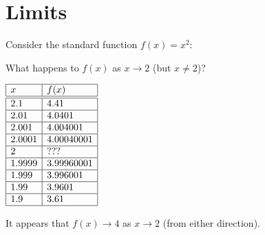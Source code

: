 \documentclass[letterpaper,12pt,fleqn]{article}
\begin{document}
\section*{Limits}

\begin{example}

  Consider the standard function \(f(x)=x^2\):

  \bigskip

  \begin{center}
  \end{center}

  \bigskip

  What happens to \(f(x)\) as \(x\to2\) (but \(x\ne 2\))?

  \bigskip

  \begin{center}
    \(\begin{array}{|l|l|}
    \hline
    x & f(x) \\
    \hline
    \hline
    2.1 & 4.41 \\
    \hline
    2.01 & 4.0401 \\
    \hline
    2.001 & 4.004001 \\
    \hline
    2.0001 & 4.00040001 \\
    \hline
    2 & ??? \\
    \hline
    1.9999 & 3.99960001 \\
    \hline
    1.999 & 3.996001 \\
    \hline
    1.99 & 3.9601 \\
    \hline
    1.9 & 3.61 \\
    \hline
    \end{array}\)
  \end{center}

  \bigskip

  It appears that \(f(x)\to4\) as \(x\to2\) (from either direction).
\end{example}
\end{document}
